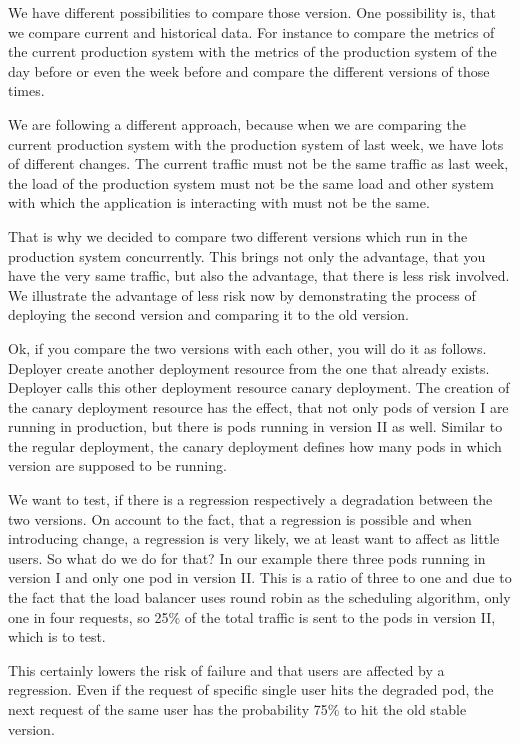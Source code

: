We have different possibilities to compare those version. One possibility is, that we
compare current and historical data. For instance to compare the metrics of the current
production system with the metrics of the production system of the day before or even the
week before and compare the different versions of those times.

We are following a different approach, because when we are comparing the current
production system with the production system of last week, we have lots of different
changes. The current traffic must not be the same traffic as last week, the load of the
production system must not be the same load and other system with which the application is
interacting with must not be the same.

That is why we decided to compare two different versions which run in the production
system concurrently. This brings not only the advantage, that you have the very same
traffic, but also the advantage, that there is less risk involved. We illustrate the
advantage of less risk now by demonstrating the process of deploying the second version
and comparing it to the old version.

Ok, if you compare the two versions with each other, you will do it as follows. Deployer
create another deployment resource from the one that already exists. Deployer calls this
other deployment resource canary deployment. The creation of the canary deployment
resource has the effect, that not only pods of version I are running in production, but
there is pods running in version II as well. Similar to the regular deployment, the canary
deployment defines how many pods in which version are supposed to be running.

We want to test, if there is a regression respectively a degradation between the two
versions. On account to the fact, that a regression is possible and when introducing
change, a regression is very likely, we at least want to affect as little users. So what
do we do for that? In our example there three pods running in version I and only one pod
in version II. This is a ratio of three to one and due to the fact that the load balancer
uses round robin as the scheduling algorithm, only one in four requests, so 25\% of the
total traffic is sent to the pods in version II, which is to test.

This certainly lowers the risk of failure and that users are affected by a
regression. Even if the request of specific single user hits the degraded pod, the next
request of the same user has the probability 75\% to hit the old stable version.

